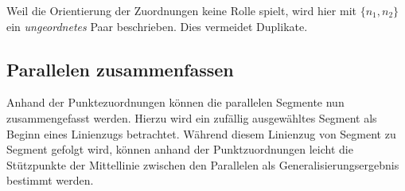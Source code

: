 \documentclass[../main/thesis.tex]{subfiles}
\begin{document}
Weil die Orientierung der Zuordnungen keine Rolle spielt, wird hier mit $\{n_1, n_2\}$ ein \emph{ungeordnetes} Paar beschrieben.
Dies vermeidet Duplikate.




\subsection{Parallelen zusammenfassen}
\label{ch:generalisation-algorithm}

%

Anhand der Punktezuordnungen können die parallelen Segmente nun zusammengefasst werden.
Hierzu wird ein zufällig ausgewähltes Segment als Beginn eines Linienzugs betrachtet.
Während diesem Linienzug von Segment zu Segment gefolgt wird, können anhand der Punktzuordnungen leicht die Stützpunkte der Mittellinie zwischen den Parallelen als Generalisierungsergebnis bestimmt werden.
\end{document}

